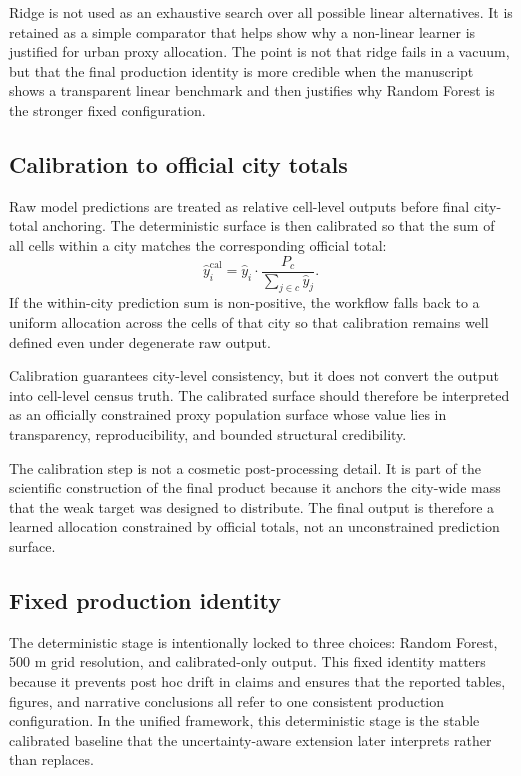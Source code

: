 Ridge is not used as an exhaustive search over all possible linear alternatives. It is retained as a simple comparator that helps show why a non-linear learner is justified for urban proxy allocation. The point is not that ridge fails in a vacuum, but that the final production identity is more credible when the manuscript shows a transparent linear benchmark and then justifies why Random Forest is the stronger fixed configuration.

\subsection{Calibration to official city totals}

Raw model predictions are treated as relative cell-level outputs before final city-total anchoring. The deterministic surface is then calibrated so that the sum of all cells within a city matches the corresponding official total:
\[
\hat{y}_i^{\mathrm{cal}} = \hat{y}_i \cdot \frac{P_c}{\sum_{j \in c}\hat{y}_j}.
\]
If the within-city prediction sum is non-positive, the workflow falls back to a uniform allocation across the cells of that city so that calibration remains well defined even under degenerate raw output.

Calibration guarantees city-level consistency, but it does not convert the output into cell-level census truth. The calibrated surface should therefore be interpreted as an officially constrained proxy population surface whose value lies in transparency, reproducibility, and bounded structural credibility.

The calibration step is not a cosmetic post-processing detail. It is part of the scientific construction of the final product because it anchors the city-wide mass that the weak target was designed to distribute. The final output is therefore a learned allocation constrained by official totals, not an unconstrained prediction surface.

\subsection{Fixed production identity}

The deterministic stage is intentionally locked to three choices: Random Forest, 500 m grid resolution, and calibrated-only output. This fixed identity matters because it prevents post hoc drift in claims and ensures that the reported tables, figures, and narrative conclusions all refer to one consistent production configuration. In the unified framework, this deterministic stage is the stable calibrated baseline that the uncertainty-aware extension later interprets rather than replaces.
